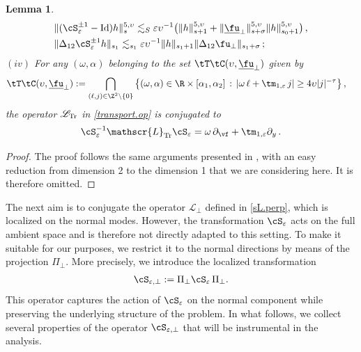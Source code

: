 \documentclass[a4paper,reqno,10pt]{article}
\newtheorem{lem}{Lemma}[section]
\newcommand{\pa}{\partial}
\newcommand{\sL}{\mathscr{L}}
\begin{document}
\begin{lem}
\begin{align}
		&	\| (\cS_{\varepsilon}^{\pm 1}-{\rm Id}) h \|_{s}^{5,\upsilon} \lesssim_{S} \varepsilon\upsilon^{-1} \big( \|h \|_{s+1}^{5,\upsilon} + \| \underline{\fu}_{\perp} \|_{s+\sigma}^{5,\upsilon} \|h \|_{s_0+1}^{5,\upsilon}  \big) \,, \\
		& \| \Delta_{12} \cS_{\varepsilon}^{\pm 1} h \|_{s_1} \lesssim_{s_1} \varepsilon \upsilon^{-1}\| h \|_{s_1+1} \| \Delta_{12}\fu_{\perp} \|_{s_1+\sigma} \,;
	\end{align}
	\noindent $(iv)$ 
    For any $(\omega,\alpha)$ belonging to the set $ \tT\tC(\upsilon,\underline{\fu}_{\perp}) $ given by
	\begin{align}
		\tT\tC(\upsilon,\underline{\fu}_{\perp}) &:=  \bigcap_{(\ell,j)\in\Z^2 \setminus\{0\}} \big\{  (\omega,\alpha) \in \R \times [\alpha_{1},\alpha_{2}]  \,:\, |\omega\,\ell + \tm_{1,\varepsilon}\,j |\geq 4\upsilon|j|^{-\tau}
		\big\}\,,\label{nonres.transport}
	\end{align}
	the operator $\sL_{\rm Tr}$ in \eqref{transport.op} is conjugated to
	\begin{equation}
		\cS_{\varepsilon}^{-1} \sL_{\rm Tr} \cS_{\varepsilon} = \omega\,\pa_{\vf} + \tm_{1,\varepsilon} \pa_{y}\,.
	\end{equation}
	
\end{lem}
\begin{proof}
	The proof follows the same arguments presented in \cite[Lemma 9.8, Theorem C.2]{FMT25}, with an easy reduction from dimension 2 to the dimension 1 that we are considering here.  It is therefore omitted.
\end{proof}
The next aim is to conjugate the operator $\sL_{\perp}$ defined in \eqref{sL.perp}, which is localized on the normal modes. However, the transformation $\cS_{\varepsilon}$ acts on the full ambient space and is therefore not directly adapted to this setting. To make it suitable for our purposes, we restrict it to the normal directions by means of the projection $\Pi_{\perp}$.
More precisely, we introduce the localized transformation
\begin{align}\label{cS.eps.perp}
\cS_{\varepsilon,\perp}:= \Pi_{\perp} \cS_{\varepsilon}\, \Pi_{\perp}.
\end{align}
This operator captures the action of $\cS_{\varepsilon}$ on the normal component while preserving the underlying structure of the problem. 
In what follows, we collect several properties of the operator $\cS_{\varepsilon,\perp}$ that will be instrumental in the analysis.
\end{document}
